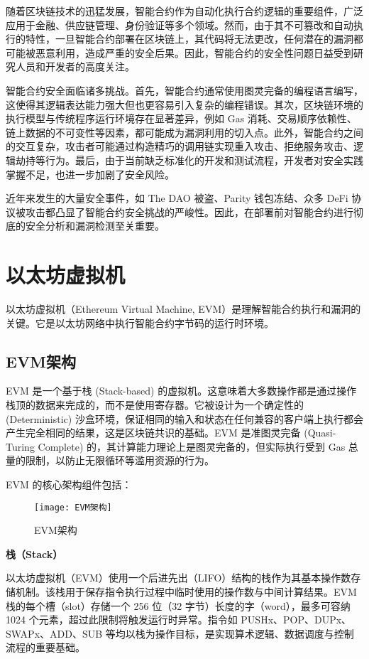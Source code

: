\documentclass[print, master, vlined, timesmath]{DissertUESTC}
\begin{document}
随着区块链技术的迅猛发展，智能合约作为自动化执行合约逻辑的重要组件，广泛应用于金融、供应链管理、身份验证等多个领域。然而，由于其不可篡改和自动执行的特性，一旦智能合约部署在区块链上，其代码将无法更改，任何潜在的漏洞都可能被恶意利用，造成严重的安全后果。因此，智能合约的安全性问题日益受到研究人员和开发者的高度关注\cite{}。

智能合约安全面临诸多挑战。首先，智能合约通常使用图灵完备的编程语言编写，这使得其逻辑表达能力强大但也更容易引入复杂的编程错误\cite{}。其次，区块链环境的执行模型与传统程序运行环境存在显著差异，例如 Gas 消耗\cite{}、交易顺序依赖性\cite{}、链上数据的不可变性等因素，都可能成为漏洞利用的切入点。此外，智能合约之间的交互复杂，攻击者可能通过构造精巧的调用链实现重入攻击\cite{}、拒绝服务攻击\cite{}、逻辑劫持等行为。最后，由于当前缺乏标准化的开发和测试流程，开发者对安全实践掌握不足，也进一步加剧了安全风险\cite{}。

近年来发生的大量安全事件，如 The DAO 被盗\cite{}、Parity 钱包冻结\cite{}、众多 DeFi 协议被攻击\cite{}都凸显了智能合约安全挑战的严峻性。因此，在部署前对智能合约进行彻底的安全分析和漏洞检测至关重要。

\section{以太坊虚拟机}
以太坊虚拟机（Ethereum Virtual Machine, EVM）是理解智能合约执行和漏洞的关键。它是以太坊网络中执行智能合约字节码的运行时环境\cite{}。

\subsection{EVM架构}

EVM 是一个基于栈 (Stack-based) 的虚拟机\cite{}。这意味着大多数操作都是通过操作栈顶的数据来完成的，而不是使用寄存器。它被设计为一个确定性的 (Deterministic) 沙盒环境\cite{}，保证相同的输入和状态在任何兼容的客户端上执行都会产生完全相同的结果，这是区块链共识的基础。EVM 是准图灵完备 (Quasi-Turing Complete) 的\cite{}，其计算能力理论上是图灵完备的，但实际执行受到 Gas 总量的限制，以防止无限循环等滥用资源的行为。

EVM 的核心架构组件包括：

\begin{figure}[htbp]
    \centering
    \texttt{[image: EVM架构]}
    \caption{EVM架构}
    \label{fig:EVM架构}
\end{figure}

\textbf{栈（Stack）}

以太坊虚拟机（EVM）使用一个后进先出（LIFO）结构的栈作为其基本操作数存储机制\cite{}。该栈用于保存指令执行过程中临时使用的操作数与中间计算结果。EVM 栈的每个槽（slot）存储一个 256 位（32 字节）长度的字（word），最多可容纳 1024 个元素\cite{}，超过此限制将触发运行时异常。指令如 PUSHx、POP、DUPx、SWAPx、ADD、SUB 等均以栈为操作目标，是实现算术逻辑、数据调度与控制流程的重要基础。
\end{document}
